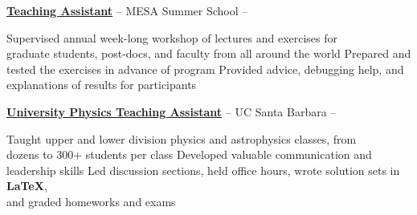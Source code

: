 \documentclass[letterpaper,MMMyyyy,nonstopmode]{simpleresumecv}
\begin{document}
\begin{Body}
\begin{Detail}
\Entry
\href{http://cococubed.asu.edu/mesa_summer_school_2018/}
{\textbf{Teaching Assistant}} -- MESA Summer School \hfill {} -- 
\Gap




\BulletItem
Supervised annual week-long workshop of lectures and exercises for \\graduate students, post-docs, and faculty from all around the world
\BulletItem
Prepared and tested the exercises in advance of program%
\BulletItem
Provided advice, debugging help, and explanations of results for participants\vspace{2mm}
\vspace{1.5mm}

\Entry
\href{https://www.ucsb.edu/}
{\textbf{University Physics Teaching Assistant}} -- UC Santa Barbara \hfill {} -- 
\Gap




\BulletItem
Taught upper and lower division physics and astrophysics classes, from \\dozens to 300+ students per class
\BulletItem
Developed valuable communication and leadership skills
\BulletItem
Led discussion sections, held office hours, wrote solution sets in \textbf{LaTeX}, \\and graded 
homeworks and exams
\vspace{2mm}
\end{Detail}








\end{Body}
\end{document}
